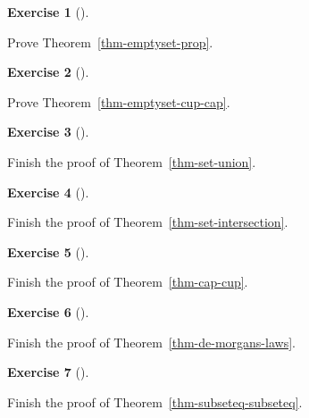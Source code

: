 \documentclass[
  letterpaper,
  10pt,
  reqno,
  twopage,
  openany]{book}
\theoremstyle{plain}
\theoremstyle{definition}
\newtheorem{exercise}{Exercise}[chapter]
\theoremstyle{definition}
\theoremstyle{definition}
\theoremstyle{plain}
\theoremstyle{plain}
\theoremstyle{remark}
\begin{document}
\leavevmode{}%
\begin{exercise}[]\label{exr-emptyset-prop}

Prove Theorem~\ref{thm-emptyset-prop}.

\end{exercise}

\leavevmode{}%
\begin{exercise}[]\label{exr-emptyset-cup-cap}

Prove Theorem~\ref{thm-emptyset-cup-cap}.

\end{exercise}

\leavevmode{}%
\begin{exercise}[]\label{exr-set-union}

Finish the proof of Theorem~\ref{thm-set-union}.

\end{exercise}

\leavevmode{}%
\begin{exercise}[]\label{exr-set-intersection}

Finish the proof of Theorem~\ref{thm-set-intersection}.

\end{exercise}

\leavevmode{}%
\begin{exercise}[]\label{exr-cap-cup}

Finish the proof of Theorem~\ref{thm-cap-cup}.

\end{exercise}

\leavevmode{}%
\begin{exercise}[]\label{exr-de-morgans-laws}

Finish the proof of Theorem~\ref{thm-de-morgans-laws}.

\end{exercise}

\leavevmode{}%
\begin{exercise}[]\label{exr-subseteq-subseteq}

Finish the proof of Theorem~\ref{thm-subseteq-subseteq}.

\end{exercise}
\end{document}
